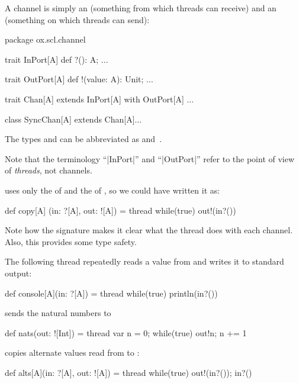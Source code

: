 \documentclass[notes,color]{sepslide0}
\begin{document}

\begin{slide}

A channel is simply an  (something from which threads can
receive) and an  (something on which threads can send):
%
\begin{scala}
  package ox.scl.channel

  trait InPort[A]  { def ?(): A; ... }
        
  trait OutPort[A] { def !(value: A): Unit; ... }
  
  trait Chan[A] extends InPort[A] with OutPort[A]{ ... }

  class SyncChan[A] extends Chan[A]{...} 
\end{scala}

The types  and  can be abbreviated as
 and~\SCALA{![A]}.

Note that the terminology ``|InPort|'' and ``|OutPort|'' refer to the point of
view of \emph{threads}, not channels.
\end{slide}


\begin{slide}

 uses only the  of  and the
 of , so we could have written it as:
%
\begin{scala}
def copy[A] (in: ?[A], out: ![A]) = thread{ 
  while(true){ out!(in?()) } 
}
\end{scala}
%
Note how the signature makes it clear what the thread does with each
channel.  Also, this provides some type safety.
\end{slide}



\begin{slide}

The following thread  repeatedly reads a
value from  and writes it to standard output:
%
\begin{scala}
  def console[A](in: ?[A]) = thread{ while(true) println(in?()) }
\end{scala}

 sends the natural numbers to 
%
\begin{scala}
  def nats(out: ![Int]) = thread{ 
    var n = 0; while(true){ out!n; n += 1 }
  }
\end{scala}

 copies alternate values read from  to :
\begin{scala}
  def alts[A](in: ?[A], out: ![A]) = thread{ 
    while(true){ out!(in?()); in?() } 
  }
\end{scala}
\end{slide}
\end{document}
